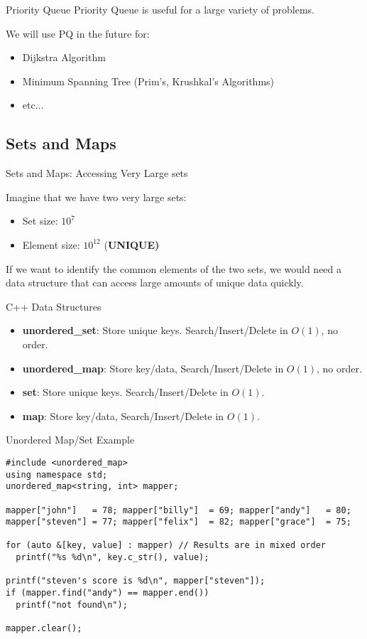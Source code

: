 \begin{frame}{Priority Queue}
  Priority Queue is useful for a large variety of problems.\vfill

  We will use PQ in the future for:
  \begin{itemize}
    \item Dijkstra Algorithm
    \item Minimum Spanning Tree (Prim's, Krushkal's Algorithms)
    \item etc...
  \end{itemize}
\end{frame}

\subsection{Sets and Maps}

\begin{frame}{Sets and Maps: Accessing Very Large sets}

  Imagine that we have two very large sets:
  \begin{itemize}
    \item Set size: $10^7$
    \item Element size: $10^{12}$ (\bf UNIQUE)
  \end{itemize}

  If we want to identify the common elements of the two sets, we would need a data structure that can access large amounts of unique data quickly.

  \begin{block}{C++ Data Structures}
    \begin{itemize}
      \item {\bf unordered\_set}: Store unique keys. Search/Insert/Delete in $O(1)$, no order.
      \item {\bf unordered\_map}: Store key/data, Search/Insert/Delete in $O(1)$, no order.
      \item {\bf set}: Store unique keys. Search/Insert/Delete in $O(1)$.
      \item {\bf map}: Store key/data, Search/Insert/Delete in $O(1)$.
    \end{itemize}
  \end{block}
\end{frame}

\begin{frame}[fragile]{Unordered Map/Set Example}

{\small
\begin{verbatim}
#include <unordered_map>
using namespace std;
unordered_map<string, int> mapper;

mapper["john"]   = 78; mapper["billy"]  = 69; mapper["andy"]   = 80;
mapper["steven"] = 77; mapper["felix"]  = 82; mapper["grace"]  = 75;

for (auto &[key, value] : mapper) // Results are in mixed order
  printf("%s %d\n", key.c_str(), value);

printf("steven's score is %d\n", mapper["steven"]);
if (mapper.find("andy") == mapper.end())
  printf("not found\n");

mapper.clear();
\end{verbatim}}
\end{frame}


